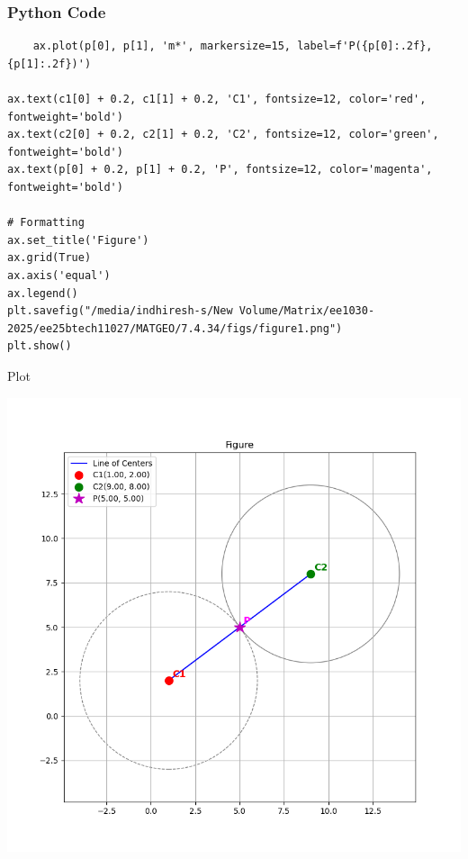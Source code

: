 \documentclass{beamer}
\begin{document}
     \begin{frame}[fragile]
        \frametitle{Python Code}
        \begin{lstlisting}
    ax.plot(p[0], p[1], 'm*', markersize=15, label=f'P({p[0]:.2f}, {p[1]:.2f})')

ax.text(c1[0] + 0.2, c1[1] + 0.2, 'C1', fontsize=12, color='red', fontweight='bold')
ax.text(c2[0] + 0.2, c2[1] + 0.2, 'C2', fontsize=12, color='green', fontweight='bold')
ax.text(p[0] + 0.2, p[1] + 0.2, 'P', fontsize=12, color='magenta', fontweight='bold')

# Formatting
ax.set_title('Figure')
ax.grid(True)
ax.axis('equal')
ax.legend()
plt.savefig("/media/indhiresh-s/New Volume/Matrix/ee1030-2025/ee25btech11027/MATGEO/7.4.34/figs/figure1.png")
plt.show()
        \end{lstlisting}
    \end{frame}
    
    \begin{frame}{Plot}
        \begin{center}
            \includegraphics[width=\columnwidth, height=0.8\textheight, keepaspectratio]{figs/figure1.png}
        \end{center}
    \end{frame}
    
    
\end{document}
